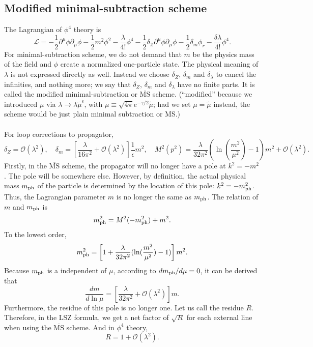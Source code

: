 \subsection{Modified minimal-subtraction scheme}
The Lagrangian of $\phi^4$ theory is
\[\mathcal{L} = -\frac{1}{2} \partial^{\mu} \phi \partial_{\mu} \phi -\frac{1}{2}m^2 \phi^2 - \frac{\lambda}{4!}\phi^4 -\frac{1}{2} \delta_Z \partial^{\mu} \phi \partial_{\mu} \phi -\frac{1}{2}\delta_m \phi_r - \frac{\delta \lambda}{4!}\phi^4.\]
For minimal-subtraction scheme, we do not demand that $m$ be the physics mass of the field and $\phi$  create a normalized one-particle state. The physical meaning of $\lambda$ is not expressed directly as well. Instead we choose $\delta_Z$, $\delta_m$ and $\delta_{\lambda}$ to cancel the infinities, and nothing more;
we say that $\delta_Z$, $\delta_m$ and $\delta_{\lambda}$ have no finite parts. It is called the modified minimal-subtraction or $\mathrm{\overline{MS}}$ scheme. (``modified'' because we introduced $\mu$ via  $\lambda \to \lambda \tilde{\mu}^{\epsilon}$, with $\mu \equiv  \sqrt{4\pi} e^{-\gamma/2} \tilde{\mu}$; had we set $\mu = \tilde{\mu}$ instead, the scheme would be just plain minimal subtraction or MS.)
\\ \\
For loop corrections to propagator,
\[\delta_Z=\mathcal{O}(\lambda^2) , \quad \delta_m = \left[ \frac{\lambda}{16\pi^2} + \mathcal{O}(\lambda^2) \right]\frac{1}{\epsilon}m^2 , \quad M^2(p^2) = \frac{\lambda}{32\pi^2}( \ln(\frac{m^2}{\mu^2})-1)m^2 + \mathcal{O}(\lambda^2).\]
Firstly, in the $\mathrm{\overline{MS}}$ scheme, the propagator will no longer have a pole at $k^2=-m^2$. The pole will be somewhere else. However, by definition, the actual physical mass $m_{\rm ph}$ of the particle is determined by the location of this pole: $k^2 = -m_{\rm ph}^2$. Thus, the Lagrangian parameter $m$ is no longer the same as $m_{\rm ph}$. The relation of $m$ and $m_{\rm ph}$ is 
\[m_{\rm ph}^2 = M^2(-m_{\rm ph}^2) + m^2.\]
To the lowest order, 
\[m_{\rm ph}^2 = \left[1+\frac{\lambda}{32\pi^2}( \ln(\frac{m^2}{\mu^2})-1)\right] m^2.\]
Because $m_{\rm ph}$ is a independent of $\mu$, according to $d m_{\rm ph} / d\mu = 0$, it can be derived that
\[\frac{dm}{d\ln \mu} = \left[\frac{\lambda}{32\pi^2}+\mathcal{O}(\lambda^2)\right] m.\]
Furthermore, the residue of this pole is no longer one. Let us call the residue $R$. Therefore, in the LSZ formula, we get a net factor of $\sqrt{R}$ for each external line when using the $\mathrm{\overline{MS}}$ scheme. And in $\phi^4$ theory,
\[R = 1 + \mathcal{O}(\lambda^2).\]
